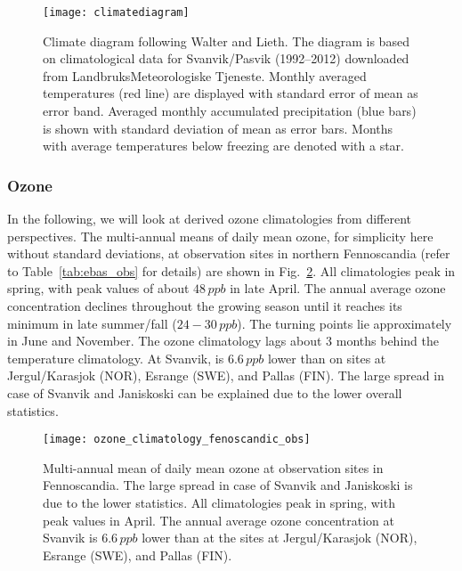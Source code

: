 \documentclass[bg, manuscript]{copernicus}
\begin{document}
\begin{figure}[t]
  \texttt{[image: climatediagram]}
  \caption{Climate diagram following Walter and Lieth. The diagram is based on climatological data for Svanvik/Pasvik (1992--2012) downloaded from LandbruksMeteorologiske Tjeneste. Monthly averaged temperatures (red line) are displayed with standard error of mean as error band. Averaged monthly accumulated precipitation (blue bars) is shown with standard deviation of mean as error bars. Months with average temperatures below freezing are denoted with a star.}
  \label{fig:climatediagram}
\end{figure}

\subsubsection{Ozone}
\label{subsubsec:clim_ozone}
In the following, we will look at derived ozone climatologies from different perspectives.
The multi-annual means of daily mean ozone, for simplicity here without standard deviations, at observation sites in northern Fennoscandia (refer to Table~\ref{tab:ebas_obs} for details) are shown in Fig.~\ref{fig:ozone_climatology_fenoscandic_obs}. All climatologies peak in spring, with peak values of about $48\,\unit{ppb}$ in late April. The annual average ozone concentration \chem{\left<[O_3]\right>} declines throughout the growing season until it reaches its minimum in late summer/fall ($24-30\,\unit{ppb}$). The turning points lie approximately in June and November. The ozone climatology lags about 3 months behind the temperature climatology. At Svanvik, \chem{\left<[O_3]\right>} is $6.6\,\unit{ppb}$ lower than on sites at Jergul/Karasjok (NOR), Esrange (SWE), and Pallas (FIN). The large spread in case of Svanvik and Janiskoski can be explained due to the lower overall statistics.

\begin{figure}[t]
  \texttt{[image: ozone\_climatology\_fenoscandic\_obs]}
  \caption{Multi-annual mean of daily mean ozone at observation sites in Fennoscandia. The large spread in case of Svanvik and Janiskoski is due to the lower statistics. All climatologies peak in spring, with peak values in April. The annual average ozone concentration \chem{\left<[O_3]\right>} at Svanvik is $6.6\,\unit{ppb}$ lower than at the sites at Jergul/Karasjok (NOR), Esrange (SWE), and Pallas (FIN).}
  \label{fig:ozone_climatology_fenoscandic_obs}
\end{figure}
\end{document}
